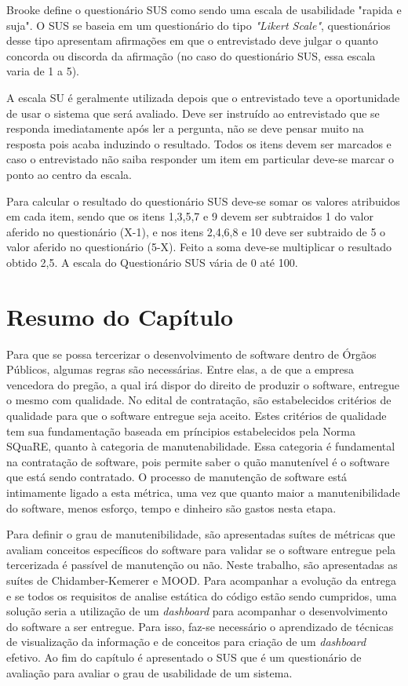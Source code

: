Brooke \cite{brooke1996sus} define o questionário SUS como sendo uma escala de usabilidade "rapida e suja". O SUS se baseia em um questionário do tipo \textit{"Likert Scale"}, questionários desse tipo apresentam afirmações em que o entrevistado deve julgar o quanto concorda ou discorda da afirmação (no caso do questionário SUS, essa escala varia de 1 a 5). 

A escala SU é geralmente utilizada depois que o entrevistado teve a oportunidade de usar o sistema que será avaliado. Deve ser instruído ao entrevistado que se responda imediatamente após ler a pergunta, não se deve pensar muito na resposta pois acaba induzindo o resultado. Todos os itens devem ser marcados e caso o entrevistado não saiba responder um item em particular deve-se marcar o ponto ao centro da escala.

Para calcular o resultado do questionário SUS deve-se somar os valores atribuidos em cada item, sendo que os itens 1,3,5,7 e 9 devem ser subtraidos 1 do valor aferido no questionário (X-1), e nos itens 2,4,6,8 e 10 deve ser subtraido de 5 o valor aferido no questionário (5-X). Feito a soma deve-se multiplicar o resultado obtido 2,5. A escala do Questionário SUS vária de 0 até 100.



\section{Resumo do Capítulo}
Para que se possa tercerizar o desenvolvimento de software dentro de Órgãos Públicos, algumas regras são necessárias. Entre elas, a de que a empresa vencedora do pregão, a qual irá dispor do direito de produzir o software, entregue o mesmo com qualidade. No edital de contratação, são estabelecidos critérios de qualidade para que o software entregue seja aceito. Estes critérios de qualidade tem sua fundamentação baseada em príncipios estabelecidos pela Norma SQuaRE, quanto à categoria de manutenabilidade. Essa categoria é fundamental na contratação de software, pois permite saber o quão manutenível é o software que está sendo contratado. O processo de manutenção de software está intimamente ligado a esta métrica, uma vez que quanto maior a manutenibilidade do software, menos esforço, tempo e dinheiro são gastos nesta etapa.

Para definir o grau de manutenibilidade, são apresentadas suítes de métricas que avaliam conceitos específicos do software para validar se o software entregue pela tercerizada é passível de manutenção ou não. Neste trabalho, são apresentadas as suítes de Chidamber-Kemerer e MOOD. Para acompanhar a evolução da entrega e se todos os requisitos de analise estática do código estão sendo cumpridos, uma solução seria a utilização de um \textit{dashboard} para acompanhar o desenvolvimento do software a ser entregue. Para isso, faz-se necessário o aprendizado de técnicas de visualização da informação e de conceitos para criação de um \textit{dashboard} efetivo. Ao fim do capítulo é apresentado o SUS que é um questionário de avaliação para avaliar o grau de usabilidade de um sistema.